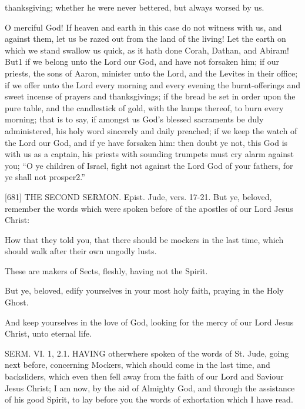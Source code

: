 thanksgiving; whether he were never bettered, but always worsed by us.

O merciful God! If heaven and earth in this case do not witness with us, and against them, let us be razed out from the land of the living! Let the earth on which we stand swallow us quick, as it hath done Corah, Dathan, and Abiram! But1 if we belong unto the Lord our God, and have not forsaken him; if our priests, the sons of Aaron, minister unto the Lord, and the Levites in their office; if we offer unto the Lord every morning and every evening the burnt-offerings and sweet incense of prayers and thanksgivings; if the bread be set in order upon the pure table, and the candlestick of gold, with the lamps thereof, to burn every morning; that is to say, if amongst us God’s blessed sacraments be duly administered, his holy word sincerely and daily preached; if we keep the watch of the Lord our God, and if ye have forsaken him: then doubt ye not, this God is with us as a captain, his priests with sounding trumpets must cry alarm against you; “O ye children of Israel, fight not against the Lord God of your fathers, for ye shall not prosper2.”

[681]
THE SECOND SERMON.
Epist. Jude, vers. 17-21.
But ye, beloved, remember the words which were spoken before of the apostles of our Lord Jesus Christ:

How that they told you, that there should be mockers in the last time, which should walk after their own ungodly lusts.

These are makers of Sects, fleshly, having not the Spirit.

But ye, beloved, edify yourselves in your most holy faith, praying in the Holy Ghost.

And keep yourselves in the love of God, looking for the mercy of our Lord Jesus Christ, unto eternal life.

SERM. VI. 1, 2.1. HAVING otherwhere spoken of the words of St. Jude, going next before, concerning Mockers, which should come in the last time, and backsliders, which even then fell away from the faith of our Lord and Saviour Jesus Christ; I am now, by the aid of Almighty God, and through the assistance of his good Spirit, to lay before you the words of exhortation which I have read.

